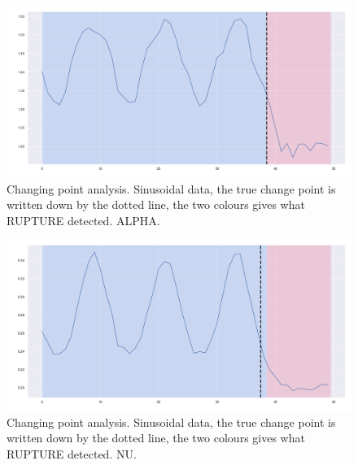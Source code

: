 \begin{figure}
\centering
\includegraphics[width = 0.90 \textwidth]{../imag/chap4/Figure_222.png}
\caption{Changing point analysis. Sinusoidal data, the true change point is written down by the dotted line, the two colours gives what RUPTURE detected. ALPHA.}
\label{fig:changing_point_222}
\end{figure}

\begin{figure}
\centering
\includegraphics[width = 0.90 \textwidth]{../imag/chap4/Figure_422.png}
\caption{Changing point analysis. Sinusoidal data, the true change point is written down by the dotted line, the two colours gives what RUPTURE detected. NU.}
\label{fig:changing_point_422}
\end{figure}
